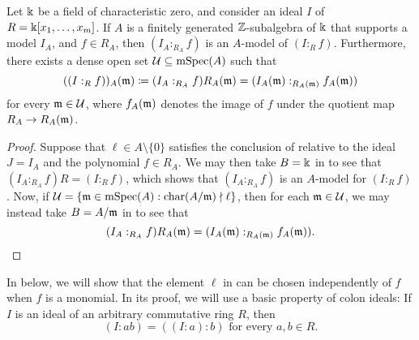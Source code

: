 \documentclass{amsart}
\begin{document}
\begin{corollary}
   \label{colon mod p: C}
   Let $\Bbbk$ be a field of characteristic zero, and consider an ideal $I$ of $R=\Bbbk[x_1, \ldots, x_m]$.
   If $A$ is a finitely generated $\mathbb{Z}$-subalgebra of $\Bbbk$ that supports a model $I_A$, and $f \in R_A$, then  $(I_A :_{R_A} f)$ is an $A$-model of $(I:_R f)$.
   Furthermore, there exists a dense open set $\mathcal{U} \subseteq \operatorname{mSpec}(A)$ such that
   \[ ((I :_R f))_A(\mathfrak{m}) \coloneqq (I_A :_{R_A} f) R_A(\mathfrak{m}) = (I_A(\mathfrak{m}) :_{R_A(\mathfrak{m})} f_A(\mathfrak{m})) \]
   for every $\mathfrak{m} \in \mathcal{U}$, where $f_A(\mathfrak{m})$ denotes the image of $f$ under the quotient map $R_A \to R_A(\mathfrak{m})$.
 \end{corollary}

 \begin{proof}
    Suppose that $\ell \in A \setminus \{0\}$ satisfies the conclusion of  relative to the ideal $J=I_A$ and the polynomial $f \in R_A$.  We may then take $B=\Bbbk$ in  to see that $(I_A:_{R_A} f)R = (I :_{R} f)$, which shows that $(I_A :_{R_A} f)$ is an $A$-model for $(I :_R f)$.
    Now, if $\mathcal{U} = \{\mathfrak{m} \in \operatorname{mSpec}(A) : \operatorname{char}(A/\mathfrak{m}) \nmid \ell\}$, then for each $\mathfrak{m} \in \mathcal{U}$, we may instead take $B=A/\mathfrak{m}$ in  to see that
    \[
       (I_A:_{R_A} f)R_A(\mathfrak{m}) = (I_A(\mathfrak{m}) :_{R_A(\mathfrak{m})} f_A(\mathfrak{m})).
       \qedhere
    \]
\end{proof}


In  below, we will show that the element $\ell$ in  can be chosen independently of $f$ when $f$ is a monomial.
In its proof, we will use a basic property of colon ideals:  If $I$ is an ideal of an arbitrary commutative ring $R$, then
\begin{equation}
\label{iterated colon: e}
 (I: ab) = ((I: a): b) \text{ for every } a,b \in R.
\end{equation}
\end{document}
